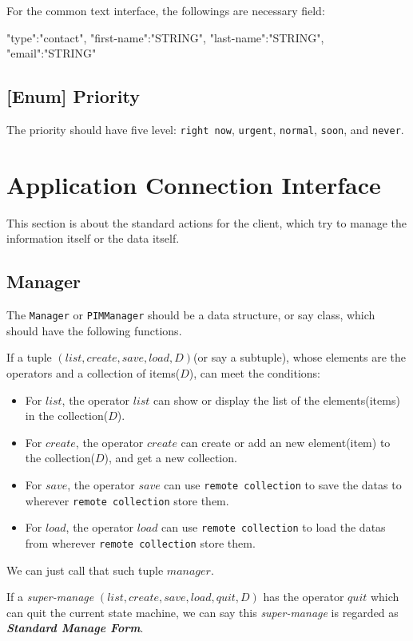 \documentclass{article}
\begin{document}
    For the common text interface, the followings are necessary field: 
    \begin{json}
 {
     "type":"contact",
     "first-name":"{STRING}",
     "last-name":"{STRING}",
     "email":"{STRING}"
 }
    \end{json}
    
    
    \subsection{[Enum] Priority}
    The priority should have five level: \verb|right now|, \verb|urgent|, \verb|normal|, \verb|soon|, and \verb|never|.
    
    \section{Application Connection Interface}
    This section is about the standard actions for the client, which try to manage the information itself or the data itself.
    
    \subsection{Manager}
    The \lstinline|Manager| or \lstinline|PIMManager| should be a data structure, or say class, which should have the following functions.
    
    If a tuple $(list,create,save,load,D)$(or say a subtuple), whose elements are the operators and a collection of items($D$), can meet the conditions:
    \begin{itemize}
        \item For $list$, the operator $list$ can show or display the list of the elements(items) in the collection($D$).
        \item For $create$, the operator $create$ can create or add an new element(item) to the collection($D$), and get a new collection.
        \item For $save$, the operator $save$ can use \verb|remote collection| to save the datas to wherever 
        \verb|remote collection| store them.
        \item For $load$, the operator $load$ can use \verb|remote collection| to load the datas from wherever
        \verb|remote collection| store them.
    \end{itemize}
    We can just call that such tuple $manager$. 
    
    If a \textit{super-manage} $(list,create,save,load,quit,D)$ has the operator $quit$ which can quit the current state machine,
    we can say this \textit{super-manage} is regarded as \textbf{\textit{Standard Manage Form}}. 
\end{document}
